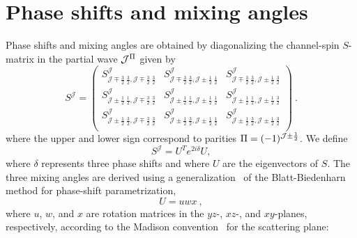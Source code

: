 \documentclass[aps,prc,showpacs,twocolumn,floatfix,nobibnotes,nofootinbib,amsmath,amssymb,longbibliography]{revtex4-2}
\begin{document}
\section{Phase shifts and mixing angles}
\label{app | phase shifts}
Phase shifts and mixing angles are obtained by diagonalizing the channel-spin $S$-matrix in the \NNN{} partial wave $\mathcal{J}^{\Pi}$ given by
\begin{equation}
	S^{\mathcal{J}} =
	\begin{pmatrix}
	S_{\mathcal{J}\mp\frac{3}{2}\:\frac{3}{2}, \mathcal{J}\mp\frac{3}{2}\:\frac{3}{2}}^{\mathcal{J}} &
	S_{\mathcal{J}\mp\frac{3}{2}\:\frac{3}{2}, \mathcal{J}\pm\frac{1}{2}\:\frac{1}{2}}^{\mathcal{J}} &
	S_{\mathcal{J}\mp\frac{3}{2}\:\frac{3}{2}, \mathcal{J}\pm\frac{1}{2}\:\frac{3}{2}}^{\mathcal{J}} \\
	S_{\mathcal{J}\pm\frac{1}{2}\:\frac{1}{2}, \mathcal{J}\mp\frac{3}{2}\:\frac{3}{2}}^{\mathcal{J}} &
	S_{\mathcal{J}\pm\frac{1}{2}\:\frac{1}{2}, \mathcal{J}\pm\frac{1}{2}\:\frac{1}{2}}^{\mathcal{J}} &
	S_{\mathcal{J}\pm\frac{1}{2}\:\frac{1}{2}, \mathcal{J}\pm\frac{1}{2}\:\frac{3}{2}}^{\mathcal{J}} \\
	S_{\mathcal{J}\pm\frac{1}{2}\:\frac{3}{2}, \mathcal{J}\mp\frac{3}{2}\:\frac{3}{2}}^{\mathcal{J}} &
	S_{\mathcal{J}\pm\frac{1}{2}\:\frac{3}{2}, \mathcal{J}\pm\frac{1}{2}\:\frac{1}{2}}^{\mathcal{J}} &
	S_{\mathcal{J}\pm\frac{1}{2}\:\frac{3}{2}, \mathcal{J}\pm\frac{1}{2}\:\frac{3}{2}}^{\mathcal{J}} \\
	\end{pmatrix} \:.
\end{equation}
where the upper and lower sign correspond to parities $\Pi =
(-1)^{\mathcal{J}\pm \frac{1}{2}}$. We define
\begin{equation}
	S^{\mathcal{J}} = U^Te^{2i\delta}U,
\end{equation}
where $\delta$ represents three phase shifts and where $U$ are the
eigenvectors of $S$. The three mixing angles are derived using a
generalization~\cite{Seyler:1969sii} of the Blatt-Biedenharn method
\cite{Blatt:1952zz} for \NN{} phase-shift parametrization,
\begin{equation}
	U = uwx \:,
\end{equation}
where $u$, $w$, and $x$ are rotation matrices in the {$yz$-}, {$xz$-,} and
$xy$-planes, respectively, according to the Madison
convention~\cite{osti_4726823} for the scattering plane:
\end{document}
